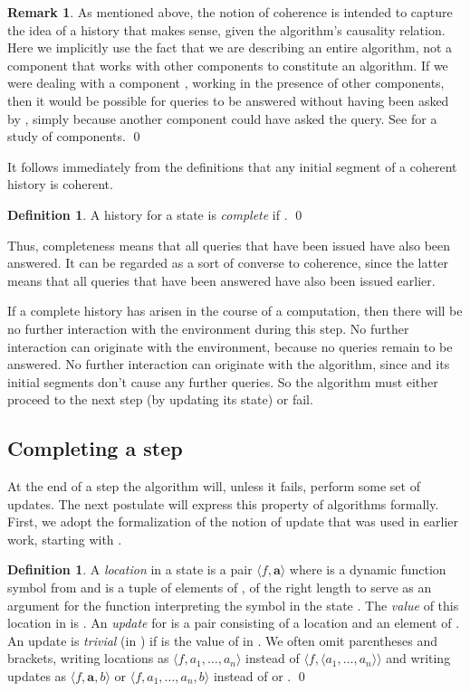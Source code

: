 \documentclass{LMCS}
\theoremstyle{definition}
\newtheorem{df}[thm]{Definition}
\newtheorem{rmk}[thm]{Remark}
\newcommand{\bld}[1]{\ensuremath{\mathbf {#1}}}
\newcommand{\sq}[1]{\ensuremath{\langle#1\rangle}}
\begin{document}
\begin{rmk}   \label{cpt1}
  As mentioned above, the notion of coherence is intended to capture
  the idea of a history that makes sense, given the algorithm's
  causality relation.  Here we implicitly use the fact that we are
  describing an entire algorithm, not a component that works with
  other components to constitute an algorithm.  If we were dealing
  with a component , working in the presence of other components,
  then it would be possible for queries to be answered without having
  been asked by , simply because another component could have asked
  the query.  See \cite{composite} for a study of components.
\qed\end{rmk}

It follows immediately from the definitions that any initial segment
of a coherent history is coherent.

\begin{df}
A history  for a state  is \emph{complete} if
.
\qed\end{df}

Thus, completeness means that all queries that have been issued have
also been answered.  It can be regarded as a sort of converse to
coherence, since the latter means that all queries that have
been answered have also been issued earlier.

If a complete history has arisen in the course of a computation, then
there will be no further interaction with the environment during this
step.  No further interaction can originate with the environment,
because no queries remain to be answered.  No further interaction can
originate with the algorithm, since  and its initial segments
don't cause any further queries.  So the algorithm must either proceed
to the next step (by updating its state) or fail.

\subsection{Completing a step}

At the end of a step the algorithm will, unless it fails, perform some
set of updates.  The next postulate will express this property of
algorithms formally.  First, we adopt the formalization of the notion of
update that was used in earlier work, starting with \cite{seqth}.

\begin{df}
A \emph{location} in a state  is a pair \sq{f,\bld a} where  is
a dynamic function symbol from  and  is a tuple of
elements of , of the right length to serve as an argument for the
function  interpreting the symbol  in the state .  The
\emph{value} of this location in  is .  An
\emph{update} for  is a pair  consisting of a location 
and an element  of .  An update  is \emph{trivial} (in
) if  is the value of  in .  We often omit parentheses and
brackets, writing locations as \sq{f,a_1,\dots,a_n} instead of
\sq{f,\sq{a_1,\dots,a_n}} and writing updates as \sq{f,\bld a,b} or
\sq{f,a_1,\dots,a_n,b} instead of 
or .
\qed\end{df}
\end{document}
